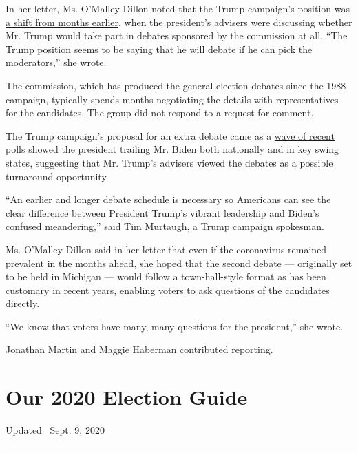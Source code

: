 In her letter, Ms. O'Malley Dillon noted that the Trump campaign's
position was
\href{https://www.nytimes3xbfgragh.onion/2019/12/12/us/politics/trump-presidential-debate-democrat.html}{a
shift from months earlier}, when the president's advisers were
discussing whether Mr. Trump would take part in debates sponsored by the
commission at all. ``The Trump position seems to be saying that he will
debate if he can pick the moderators,'' she wrote.

The commission, which has produced the general election debates since
the 1988 campaign, typically spends months negotiating the details with
representatives for the candidates. The group did not respond to a
request for comment.

The Trump campaign's proposal for an extra debate came as a
\href{https://www.nytimes3xbfgragh.onion/2020/06/09/upshot/polling-trump-erosion-support.html}{wave
of recent polls showed the president trailing Mr. Biden} both nationally
and in key swing states, suggesting that Mr. Trump's advisers viewed the
debates as a possible turnaround opportunity.

``An earlier and longer debate schedule is necessary so Americans can
see the clear difference between President Trump's vibrant leadership
and Biden's confused meandering,'' said Tim Murtaugh, a Trump campaign
spokesman.

Ms. O'Malley Dillon said in her letter that even if the coronavirus
remained prevalent in the months ahead, she hoped that the second debate
--- originally set to be held in Michigan --- would follow a
town-hall-style format as has been customary in recent years, enabling
voters to ask questions of the candidates directly.

``We know that voters have many, many questions for the president,'' she
wrote.

Jonathan Martin and Maggie Haberman contributed reporting.

\hypertarget{our-2020-election-guide}{%
\section{Our 2020 Election Guide}\label{our-2020-election-guide}}

Updated ~Sept. 9, 2020

\begin{center}\rule{0.5\linewidth}{\linethickness}\end{center}

